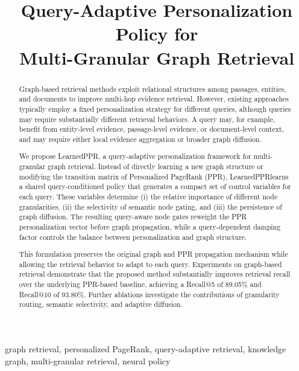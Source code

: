 \documentclass[conference]{IEEEtran}
\title{
Query-Adaptive Personalization Policy for\\
Multi-Granular Graph Retrieval
}
\author{
\IEEEauthorblockN{Anonymous Authors}
\IEEEauthorblockA{
Anonymous Institution\\
Anonymous City, Country\\
email@anonymous.org
}
}
\newcommand{\method}{LearnedPPR}
\begin{document}
\maketitle

\begin{abstract}
Graph-based retrieval methods exploit relational structures among
passages, entities, and documents to improve multi-hop evidence
retrieval. However, existing approaches typically employ a fixed
personalization strategy for different queries, although queries may
require substantially different retrieval behaviors. A query may, for
example, benefit from entity-level evidence, passage-level evidence,
or document-level context, and may require either local evidence
aggregation or broader graph diffusion.

We propose \method, a query-adaptive personalization framework for
multi-granular graph retrieval. Instead of directly learning a new
graph structure or modifying the transition matrix of Personalized
PageRank (PPR), \method learns a shared query-conditioned policy that
generates a compact set of control variables for each query. These
variables determine (i) the relative importance of different node
granularities, (ii) the selectivity of semantic node gating, and
(iii) the persistence of graph diffusion. The resulting query-aware
node gates reweight the PPR personalization vector before graph
propagation, while a query-dependent damping factor controls the
balance between personalization and graph structure.

This formulation preserves the original graph and PPR propagation
mechanism while allowing the retrieval behavior to adapt to each
query. Experiments on graph-based retrieval demonstrate that the
proposed method substantially improves retrieval recall over the
underlying PPR-based baseline, achieving a Recall@5 of 89.05\% and
Recall@10 of 93.80\%. Further ablations investigate the contributions
of granularity routing, semantic selectivity, and adaptive diffusion.
\end{abstract}

\begin{IEEEkeywords}
graph retrieval, personalized PageRank, query-adaptive retrieval,
knowledge graph, multi-granular retrieval, neural policy
\end{IEEEkeywords}

\end{document}
